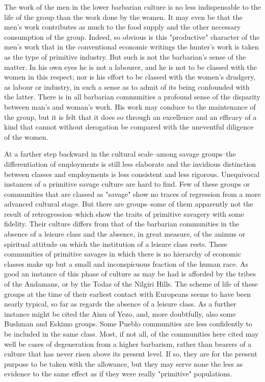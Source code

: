 \documentclass[12pt]{report}
\begin{document}
The work of the men in the lower barbarian culture is no less
indispensable to the life of the group than the work done by the women.
It may even be that the men's work contributes as much to the food
supply and the other necessary consumption of the group. Indeed, so
obvious is this "productive" character of the men's work that in the
conventional economic writings the hunter's work is taken as the type of
primitive industry. But such is not the barbarian's sense of the matter.
In his own eyes he is not a labourer, and he is not to be classed with
the women in this respect; nor is his effort to be classed with the
women's drudgery, as labour or industry, in such a sense as to admit
of its being confounded with the latter. There is in all barbarian
communities a profound sense of the disparity between man's and woman's
work. His work may conduce to the maintenance of the group, but it is
felt that it does so through an excellence and an efficacy of a kind
that cannot without derogation be compared with the uneventful diligence
of the women.

At a farther step backward in the cultural scale--among savage
groups--the differentiation of employments is still less elaborate
and the invidious distinction between classes and employments is less
consistent and less rigorous. Unequivocal instances of a primitive
savage culture are hard to find. Few of these groups or communities
that are classed as "savage" show no traces of regression from a more
advanced cultural stage. But there are groups--some of them apparently
not the result of retrogression--which show the traits of primitive
savagery with some fidelity. Their culture differs from that of the
barbarian communities in the absence of a leisure class and the absence,
in great measure, of the animus or spiritual attitude on which the
institution of a leisure class rests. These communities of primitive
savages in which there is no hierarchy of economic classes make up but a
small and inconspicuous fraction of the human race. As good an instance
of this phase of culture as may be had is afforded by the tribes of the
Andamans, or by the Todas of the Nilgiri Hills. The scheme of life of
these groups at the time of their earliest contact with Europeans seems
to have been nearly typical, so far as regards the absence of a leisure
class. As a further instance might be cited the Ainu of Yezo, and, more
doubtfully, also some Bushman and Eskimo groups. Some Pueblo communities
are less confidently to be included in the same class. Most, if not all,
of the communities here cited may well be cases of degeneration from a
higher barbarism, rather than bearers of a culture that has never risen
above its present level. If so, they are for the present purpose to be
taken with the allowance, but they may serve none the less as evidence
to the same effect as if they were really "primitive" populations.
\end{document}
